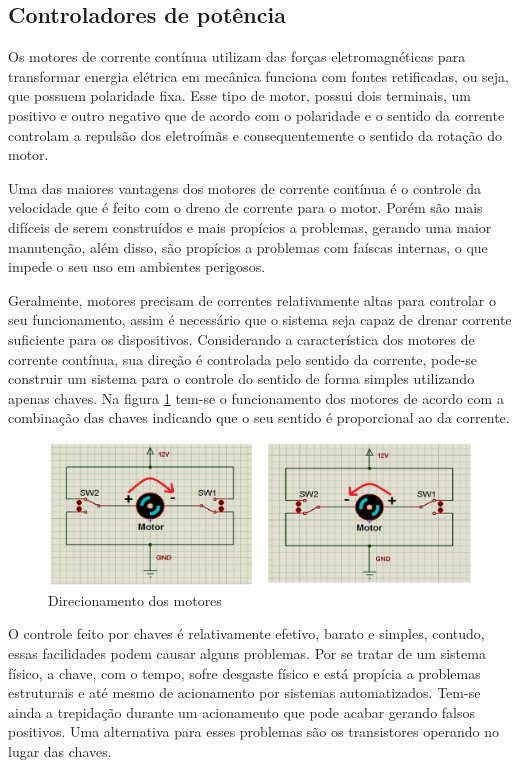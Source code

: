 \subsection{Controladores de potência}

Os motores de corrente contínua utilizam das forças eletromagnéticas para transformar energia elétrica em mecânica funciona com fontes retificadas, ou seja, que possuem polaridade fixa. Esse tipo de motor, possui dois terminais, um positivo e outro negativo que de acordo com o polaridade e o sentido da corrente controlam a repulsão dos eletroímãs e consequentemente o sentido da rotação do motor.

Uma das maiores vantagens dos motores de corrente contínua é o controle da velocidade que é feito com o dreno de corrente para o motor. Porém são mais difíceis de serem construídos e mais propícios a problemas, gerando uma maior manutenção, além disso, são propícios a problemas com faíscas internas, o que impede o seu uso em ambientes perigosos.

Geralmente, motores precisam de correntes relativamente altas para controlar o seu funcionamento, assim é necessário que o sistema seja capaz de drenar corrente suficiente para os dispositivos. Considerando a característica dos motores de corrente contínua, sua direção é controlada pelo sentido da corrente, pode-se construir um sistema para o controle do sentido de forma simples utilizando apenas chaves. Na figura \ref{fig:direcionamento_motores} tem-se o funcionamento dos motores de acordo com a combinação das chaves indicando que o seu sentido é proporcional ao da corrente.

\begin{figure}[!htb]
\centering
  \includegraphics[keepaspectratio=true,scale=0.6]{figuras/controle/direcionamento_motores}
\caption{Direcionamento dos motores}
\label{fig:direcionamento_motores}
\end{figure}

O controle feito por chaves é relativamente efetivo, barato e simples, contudo, essas facilidades podem causar alguns problemas. Por se tratar de um sistema físico, a chave, com o tempo, sofre desgaste físico e está propícia a problemas estruturais e até mesmo de acionamento por sistemas automatizados. Tem-se ainda a trepidação durante um acionamento que pode acabar gerando falsos positivos. Uma alternativa para esses problemas são os transistores operando no lugar das chaves.

